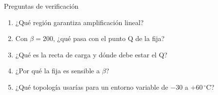 \documentclass[aspectratio=169]{beamer}
\begin{document}
\begin{frame}{Preguntas de verificación}
  \begin{enumerate}
    \item ¿Qué región garantiza amplificación lineal? 
    \item Con $\beta = 200$, ¿qué pasa con el punto Q de la fija?
    \item ¿Qué es la recta de carga y dónde debe estar el Q?
    \item ¿Por qué la fija es sensible a $\beta$? 
    \item ¿Qué topología usarías para un entorno variable de $-30$ a $+60\,^\circ\text{C}$?
  \end{enumerate}
\end{frame}
\end{document}
